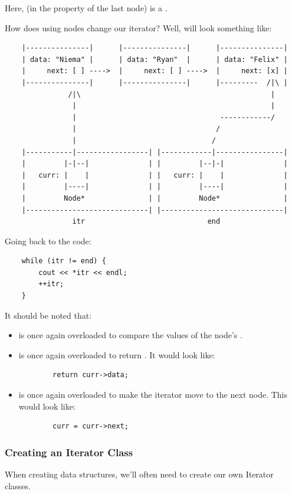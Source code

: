 \documentclass[letterpaper]{article}
\begin{document}
Here, \code{[x]} (in the  property of the last node) is a . 

\bigskip

How does using nodes change our iterator? Well,  will look something like: 
\begin{verbatim}
    |---------------|      |---------------|      |---------------|
    | data: "Niema" |      | data: "Ryan"  |      | data: "Felix" |
    |     next: [ ] ---->  |     next: [ ] ---->  |     next: [x] |
    |---------------|      |---------------|      |---------  /|\ |
               /|\                                             |
                |                                              |
                |                                  ------------/
                |                                 /  
                |                                /
    |-----------|-----------------| |------------|----------------|
    |         |-|--|              | |         |--|-|              |
    |   curr: |    |              | |   curr: |    |              |
    |         |----|              | |         |----|              |
    |         Node*               | |         Node*               |
    |-----------------------------| |-----------------------------|
                itr                             end
\end{verbatim}
Going back to the code: 
\begin{verbatim}
    while (itr != end) {
        cout << *itr << endl; 
        ++itr; 
    }
\end{verbatim}
It should be noted that: 
\begin{itemize}
    \item \code{!=} is once again overloaded to compare the values of the node's . 
    \item {} is once again overloaded to return . It would look like: 
    \begin{verbatim}
        return curr->data;
    \end{verbatim}
    \item {} is once again overloaded to make the iterator move to the next node. This would look like: 
    \begin{verbatim}
        curr = curr->next; 
    \end{verbatim}
\end{itemize}

\subsubsection{Creating an Iterator Class}
When creating data structures, we'll often need to create our own Iterator classes. 
\end{document}
